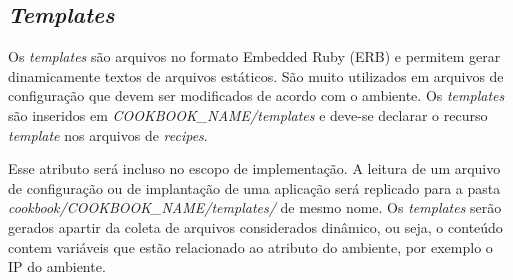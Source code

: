 
\subsection{\textit{Templates}}

Os \textit{templates} são arquivos no formato Embedded Ruby (ERB) e permitem gerar
dinamicamente textos de arquivos estáticos. São muito utilizados em arquivos
de configuração que devem ser modificados de acordo com o ambiente. Os
\textit{templates} são inseridos em \textit{COOKBOOK\_NAME/templates} e deve-se declarar o recurso
\textit{template} nos arquivos de \textit{recipes}.

Esse atributo será incluso no escopo de implementação. A leitura de um arquivo de
configuração ou de implantação de uma aplicação será replicado para a
pasta \textit{cookbook/COOKBOOK\_NAME/templates/} de mesmo nome. Os \textit{templates} serão
gerados apartir da coleta de arquivos considerados din{\^a}mico, ou seja,
o conteúdo contem variáveis que estão relacionado ao atributo do ambiente,
por exemplo o IP do ambiente.
